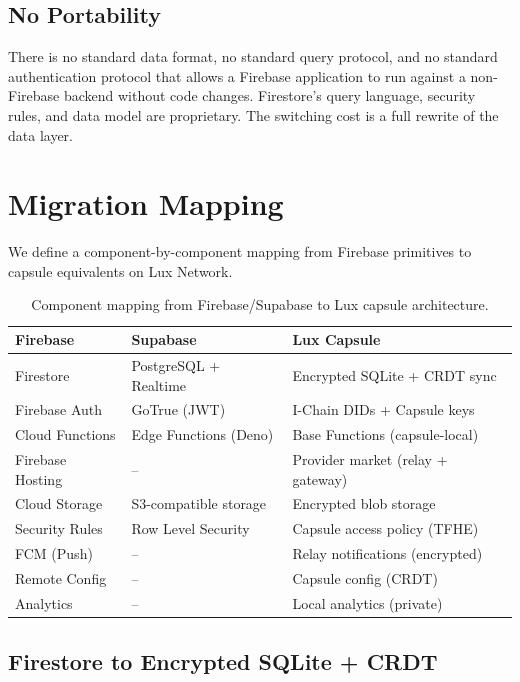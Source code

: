 \documentclass[11pt,a4paper]{article}
\begin{document}
\subsection{No Portability}

There is no standard data format, no standard query protocol, and no
standard authentication protocol that allows a Firebase application to
run against a non-Firebase backend without code changes. Firestore's
query language, security rules, and data model are proprietary. The
switching cost is a full rewrite of the data layer.

\section{Migration Mapping}\label{sec:mapping}

We define a component-by-component mapping from Firebase primitives to
capsule equivalents on Lux Network.

\begin{table}[H]
\centering
\caption{Component mapping from Firebase/Supabase to Lux capsule architecture.}
\label{tab:mapping}
\begin{tabular}{p{3.5cm}p{4.5cm}p{5cm}}
\toprule
\textbf{Firebase} & \textbf{Supabase} & \textbf{Lux Capsule} \\
\midrule
Firestore & PostgreSQL + Realtime & Encrypted SQLite + CRDT sync \\
Firebase Auth & GoTrue (JWT) & I-Chain DIDs + Capsule keys \\
Cloud Functions & Edge Functions (Deno) & Base Functions (capsule-local) \\
Firebase Hosting & -- & Provider market (relay + gateway) \\
Cloud Storage & S3-compatible storage & Encrypted blob storage \\
Security Rules & Row Level Security & Capsule access policy (TFHE) \\
FCM (Push) & -- & Relay notifications (encrypted) \\
Remote Config & -- & Capsule config (CRDT) \\
Analytics & -- & Local analytics (private) \\
\bottomrule
\end{tabular}
\end{table}

\subsection{Firestore to Encrypted SQLite + CRDT}
\end{document}

